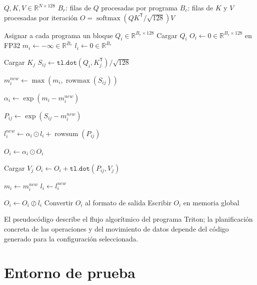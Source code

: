 \begin{algorithm}[H]
\caption{FlashAttention Triton}
\label{alg:flashattention_triton}
\begin{algorithmic}[1]

\Require \(Q,K,V\in\mathbb{R}^{N\times128}\)
\Require \(B_r\): filas de \(Q\) procesadas por programa
\Require \(B_c\): filas de \(K\) y \(V\) procesadas por iteración
\Ensure \(O=\operatorname{softmax}(QK^\mathsf{T}/\sqrt{128})V\)

\State Asignar a cada programa un bloque \(Q_i\in\mathbb{R}^{B_r\times128}\)
\State Cargar \(Q_i\)
\State \(O_i \gets 0 \in \mathbb{R}^{B_r\times128}\) en FP32
\State \(m_i \gets -\infty \in \mathbb{R}^{B_r}\)
\State \(l_i \gets 0 \in \mathbb{R}^{B_r}\)


\State Cargar \(K_j\)
\State \(S_{ij} \gets \texttt{tl.dot}(Q_i,K_j^\mathsf{T})/\sqrt{128}\)

\State \(m_i^{new}
    \gets
    \max\left(
        m_i,
        \operatorname{rowmax}(S_{ij})
    \right)\)

\State \(\alpha_i
    \gets
    \exp(m_i-m_i^{new})\)

\State \(P_{ij}
    \gets
    \exp(S_{ij}-m_i^{new})\)

\State \(l_i^{new}
    \gets
    \alpha_i\odot l_i
    +
    \operatorname{rowsum}(P_{ij})\)

\State \(O_i \gets \alpha_i\odot O_i\)

\State Cargar \(V_j\)
\State \(O_i
    \gets
    O_i
    +
    \texttt{tl.dot}(P_{ij},V_j)\)

\State \(m_i \gets m_i^{new}\)
\State \(l_i \gets l_i^{new}\)

\EndFor

\State \(O_i \gets O_i\oslash l_i\)
\State Convertir \(O_i\) al formato de salida
\State Escribir \(O_i\) en memoria global

\end{algorithmic}
\end{algorithm}

El pseudocódigo describe el flujo algorítmico del programa Triton; la planificación concreta de las operaciones y del movimiento de datos depende del código generado para la configuración seleccionada.

\chapter{Entorno de prueba}

